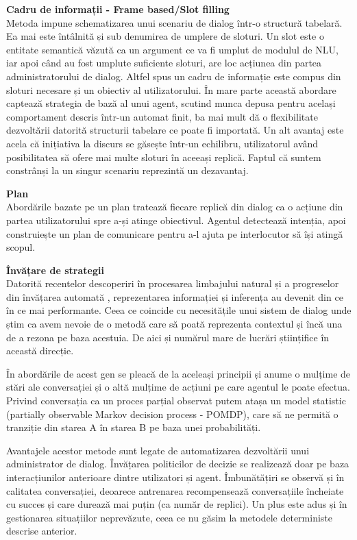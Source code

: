 \textbf{Cadru de informații - Frame based/Slot filling}\\
Metoda impune schematizarea unui scenariu de dialog într-o structură tabelară. Ea mai este întâlnită și sub denumirea de umplere de sloturi. Un slot este o entitate semantică văzută ca un argument ce va fi umplut de modulul de NLU, iar apoi când au fost umplute suficiente sloturi, are loc acțiunea din partea administratorului de dialog. Altfel spus un cadru de informație este compus din sloturi necesare și un obiectiv al utilizatorului. În mare parte această abordare captează strategia de bază al unui agent, scutind munca depusa pentru același comportament descris într-un automat finit, ba mai mult dă o flexibilitate dezvoltării datorită structurii tabelare ce poate fi importată. Un alt avantaj este acela că inițiativa la discurs se găsește într-un echilibru, utilizatorul având posibilitatea să ofere mai multe sloturi în aceeași replică. Faptul că suntem constrânși la un singur scenariu reprezintă un dezavantaj.

\textbf{Plan}\\
Abordările bazate pe un plan tratează fiecare replică din dialog ca o acțiune din partea utilizatorului spre a-și atinge obiectivul. Agentul detectează intenția, apoi construiește un plan de comunicare pentru a-l ajuta pe interlocutor să își atingă scopul.

\textbf{Învățare de strategii}\\
Datorită recentelor descoperiri în procesarea limbajului natural \cite{metode-de-reprezentare} și a progreselor din învățarea automată \cite{rnn}, reprezentarea informației și inferența au devenit din ce în ce mai performante. Ceea ce coincide cu necesitățile unui sistem de dialog unde știm ca avem nevoie de o metodă care să poată reprezenta contextul și încă una de a rezona pe baza acestuia. De aici și numărul mare de lucrări științifice în această direcție.

În abordările de acest gen se pleacă de la aceleași principii și anume o mulțime de stări ale conversației și o altă mulțime de acțiuni pe care agentul le poate efectua. Privind conversația ca un proces parțial observat putem atașa un model statistic (partially observable Markov decision process - POMDP), care să ne permită o tranziție din starea A în starea B pe baza unei probabilități.

Avantajele acestor metode sunt legate de automatizarea dezvoltării unui administrator de dialog. Învățarea politicilor de decizie se realizează doar pe baza interacțiunilor anterioare dintre utilizatori și agent. Îmbunătățiri se observă și în calitatea conversației, deoarece antrenarea recompensează conversațiile încheiate cu succes și care durează mai puțin (ca număr de replici). Un plus este adus și în gestionarea situațiilor neprevăzute, ceea ce nu găsim la metodele deterministe descrise anterior.

